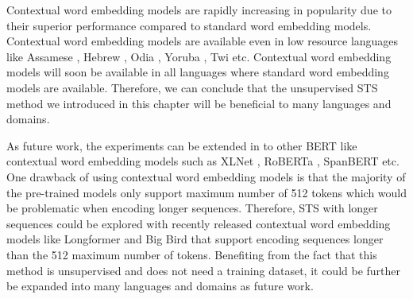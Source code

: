Contextual word embedding models are rapidly increasing in popularity due to their superior performance compared to standard word embedding models. Contextual word embedding models are available even in low resource languages like Assamese \autocite{kakwani-etal-2020-indicnlpsuite}, Hebrew \autocite{chriqui2021hebert}, Odia \autocite{kakwani-etal-2020-indicnlpsuite}, Yoruba \autocite{alabi-etal-2020-massive}, Twi \autocite{alabi-etal-2020-massive} etc.  Contextual word embedding models will soon be available in all languages where standard word embedding models are available. Therefore, we can conclude that the unsupervised STS method we introduced in this chapter will be beneficial to many languages and domains. 

As future work, the experiments can be extended in to other BERT like contextual word embedding models such as XLNet \autocite{yang2019xlnet}, RoBERTa \autocite{liu2019roberta}, SpanBERT \autocite{joshi-etal-2020-spanbert} etc. One drawback of using contextual word embedding models is that the majority of the pre-trained models only support maximum number of 512 tokens which would be problematic when encoding longer sequences. Therefore, STS with longer sequences could be explored with recently released contextual word embedding models like Longformer \autocite{beltagy2020}  and Big Bird \autocite{zaheer2021} that support encoding sequences longer than the 512 maximum number of tokens. Benefiting from the fact that this method is unsupervised and does not need a training dataset, it could be further be expanded into many languages and domains as future work.  

